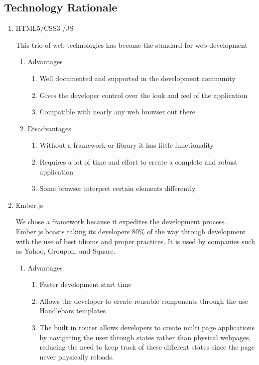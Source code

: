 \subsection{Technology Rationale}
\begin{enumerate}
\item HTML5/CSS3 /JS \par This trio of web technologies has become the standard for web development
\begin{enumerate}
\item Advantages
\begin{enumerate}
\item Well documented and supported in the development community
\item Gives the developer control over the look and feel of the application
\item Compatible with nearly any web browser out there
\end{enumerate}
\item Disadvantages
\begin{enumerate}
\item Without a framework or library it has little functionality
\item Requires a lot of time and effort to create a complete and robust application
\item Some browser interpret certain elements differently
\end{enumerate}
\end{enumerate}
\item Ember.js \par We chose a framework because it expedites the development process. Ember.js boasts taking its developers 80\% of the way through development with the use of best idioms and proper practices. It is used by companies such as Yahoo, Groupon, and Square.
\begin{enumerate}
\item Advantages
\begin{enumerate}
\item Faster development start time
\item Allows the developer to create reusable components through the use Handlebars templates
\item The built in router allows developers to create multi page applications by navigating the user through states rather than physical webpages, reducing the need to keep track of these different states since the page never physically reloads. 
\end{enumerate}

\end{enumerate}
\end{enumerate}
